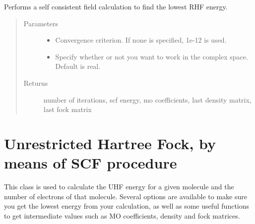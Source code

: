 \documentclass[letterpaper,10pt,english]{sphinxmanual}
\begin{document}
\begin{fulllineitems}
\begin{fulllineitems}
\label{\detokenize{RHF:ghf.RHF.RHF.scf}}
Performs a self consistent field calculation to find the lowest RHF energy.
\begin{quote}\begin{description}
\item[{Parameters}] \leavevmode\begin{itemize}
\item {} 
 \textendash{} Convergence criterion. If none is specified, 1e-12 is used.

\item {} 
 \textendash{} Specify whether or not you want to work in the complex space. Default is real.

\end{itemize}

\item[{Returns}] \leavevmode
number of iterations, scf energy, mo coefficients, last density matrix, last fock matrix

\end{description}\end{quote}

\end{fulllineitems}


\end{fulllineitems}

\label{\detokenize{UHF:module-ghf.UHF}}

\chapter{Unrestricted Hartree Fock, by means of SCF procedure}
\label{\detokenize{UHF:unrestricted-hartree-fock-by-means-of-scf-procedure}}\label{\detokenize{UHF::doc}}
This class is used to calculate the UHF energy for a given molecule and the number of electrons of that molecule.
Several options are available to make sure you get the lowest energy from your calculation, as well as some useful
functions to get intermediate values such as MO coefficients, density and fock matrices.
\end{document}
